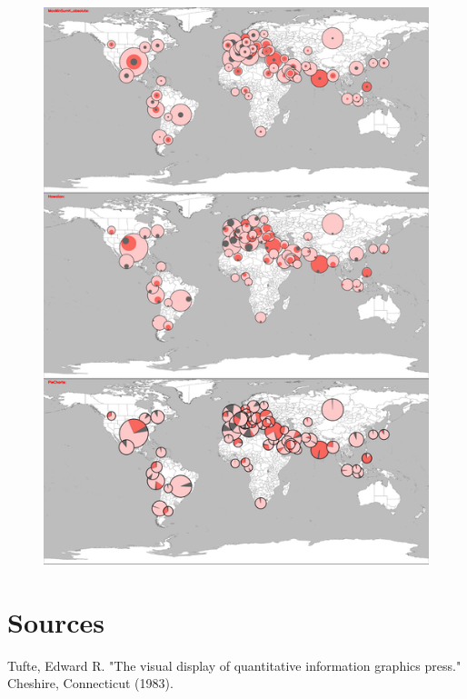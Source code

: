 \documentclass[a4paper,11pt]{article}
\begin{document}
\begin{figure}[htp]
  \includegraphics[width=\textwidth,height=\textheight,keepaspectratio]{assets/covid19_nested_discs.png}
\end{figure}


\newpage

\section{Sources}

Tufte, Edward R. "The visual display of quantitative information graphics press." Cheshire, Connecticut (1983).\\
\end{document}

